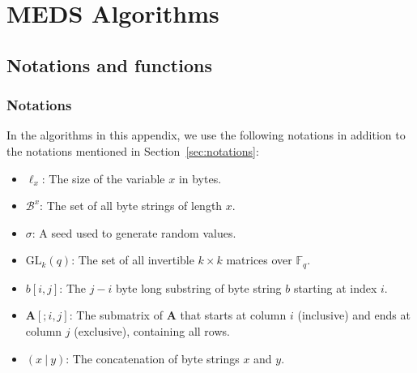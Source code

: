 \chapter{MEDS Algorithms}
\label{app:medsalgs}

\section{Notations and functions}

\subsection{Notations}
In the algorithms in this appendix, we use the following notations in addition to the notations mentioned in Section~\ref{sec:notations}:
\begin{itemize}
  \item $\ell_{x}$: The size of the variable $x$ in bytes.
  \item $\mathcal{B}^{x}$: The set of all byte strings of length $x$.
  \item $\sigma$: A seed used to generate random values.
  \item $\text{GL}_k(q)$: The set of all invertible $k \times k$ matrices over $\mathds{F}_q$.
  \item $b[i,j]$: The $j-i$ byte long substring of byte string $b$ starting at index $i$.
  \item $\textbf{A}[;i,j]$: The submatrix of $\textbf{A}$ that starts at column $i$ (inclusive) and ends at column $j$ (exclusive), containing all rows.
  \item $(x~|~y)$: The concatenation of byte strings $x$ and $y$.
\end{itemize}

